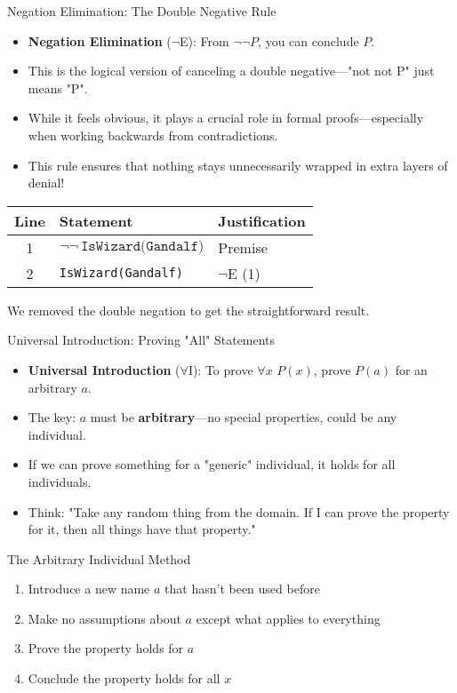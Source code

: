 \documentclass{beamer}
\begin{document}
\begin{frame}{Negation Elimination: The Double Negative Rule}
	\begin{itemize}
		\item \textbf{Negation Elimination} ($\neg$E): From $\neg \neg P$, you can conclude $P$.
		\item This is the logical version of canceling a double negative—"not not P" just means "P".
		\item While it feels obvious, it plays a crucial role in formal proofs—especially when working backwards from contradictions.
		\item This rule ensures that nothing stays unnecessarily wrapped in extra layers of denial!
	\end{itemize}
	
	\begin{example}
		\scriptsize{
			\begin{tabular}{|c|l|l|}
				\hline
				\textbf{Line} & \textbf{Statement} & \textbf{Justification} \\
				\hline
				1 & $\neg\neg\,\texttt{IsWizard(Gandalf)}$ & Premise \\
				2 & \texttt{IsWizard(Gandalf)} & $\neg$E (1) \\
				\hline
			\end{tabular}
			
			We removed the double negation to get the straightforward result.
		}
	\end{example}\end{frame}

	\begin{frame}{Universal Introduction: Proving "All" Statements}
		\begin{itemize}
			\item \textbf{Universal Introduction} ($\forall$I): To prove $\forall x$ $P(x)$, prove $P(a)$ for an arbitrary $a$.
			\item The key: $a$ must be \textbf{arbitrary}—no special properties, could be any individual.
			\item If we can prove something for a "generic" individual, it holds for all individuals.
			\item Think: "Take any random thing from the domain. If I can prove the property for it, then all things have that property."
		\end{itemize}
		
		\begin{block}{The Arbitrary Individual Method}
			\begin{enumerate}
				\item Introduce a new name $a$ that hasn't been used before
				\item Make no assumptions about $a$ except what applies to everything
				\item Prove the property holds for $a$
				\item Conclude the property holds for all $x$
			\end{enumerate}
		\end{block}
	\end{frame}
	
\end{document}

